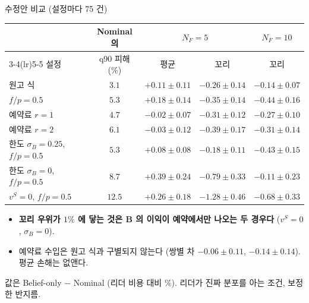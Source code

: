 \documentclass[aspectratio=169,11pt]{beamer}
\begin{document}
\begin{frame}{수정안 비교 (설정마다 75 건)}
\begin{center}
\scriptsize
\begin{tabular}{lcccc}
\toprule
 & Nominal 의& \multicolumn{2}{c}{$N_F = 5$} & $N_F = 10$\\
\cmidrule(lr){3-4}\cmidrule(lr){5-5}
설정 & q90 피해 (\%) & 평균 & 꼬리 & 꼬리\\
\midrule
원고 식 & $3.1$ & $+0.11 \pm 0.11$ & $-0.26 \pm 0.14$ & $-0.14 \pm 0.07$\\
$f/p = 0.5$ & $5.3$ & $+0.18 \pm 0.14$ & $-0.35 \pm 0.14$ & $-0.44 \pm 0.16$\\
\midrule
예약료 $r = 1$ & $4.7$ & $-0.02 \pm 0.07$ & $-0.31 \pm 0.12$ & $-0.27 \pm 0.10$\\
예약료 $r = 2$ & $6.1$ & $-0.03 \pm 0.12$ & $-0.39 \pm 0.17$ & $-0.31 \pm 0.14$\\
\midrule
한도 $\sigma_B = 0.25$, $f/p = 0.5$ & $5.3$ & $+0.08 \pm 0.08$ & $-0.18 \pm 0.11$ & $-0.43 \pm 0.15$\\
한도 $\sigma_B = 0$, $f/p = 0.5$ & $8.7$ & $+0.39 \pm 0.24$ & $-0.79 \pm 0.33$ & $-0.11 \pm 0.23$\\
\midrule
$v^{S} = 0$, $f/p = 0.5$ & $12.5$ & $+0.26 \pm 0.18$ & $-1.28 \pm 0.46$ & $-0.68 \pm 0.33$\\
\bottomrule
\end{tabular}
\end{center}
\begin{itemize}
  \item \textbf{꼬리 우위가 $1\%$ 에 닿는 것은 B 의 이익이 예약에서만 나오는 두 경우다} ($v^{S} = 0$, $\sigma_B = 0$).
  \item 예약료 수입은 원고 식과 구별되지 않는다 (쌍별 차 $-0.06 \pm 0.11$, $-0.14 \pm 0.14$). 평균 손해는 없앤다.
\end{itemize}
{\scriptsize 값은 Belief-only $-$ Nominal (리더 비용 대비 \%). 리더가 진짜 분포를 아는 조건, 보정한 반지름.}
\end{frame}
\end{document}
